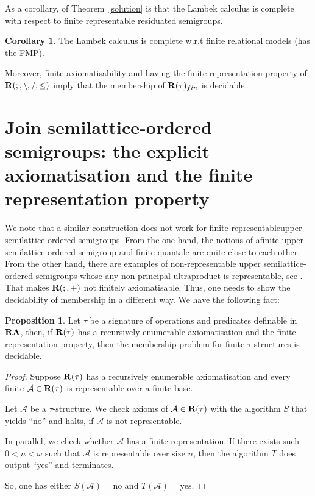 \documentclass[a4paper]{article}
\theoremstyle{definition}
\theoremstyle{theorem}
\theoremstyle{proposition}
\newtheorem{proposition}{Proposition}
\theoremstyle{lemma}
\theoremstyle{ex}
\theoremstyle{corollary}
\newtheorem{corollary}{Corollary}
\theoremstyle{claim}
\begin{document}
As a corollary, of Theorem~\ref{solution} is that the Lambek calculus is complete with respect to finite representable residuated semigroups.

\begin{corollary} \label{fmp}
  The Lambek calculus is complete w.r.t finite relational models (has the FMP).
\end{corollary}

Moreover, finite axiomatisability and having the finite representation property of ${\bf R}(;, \setminus, /, \leq)$ imply that the membership of ${\bf R}(\tau)_{fin}$ is decidable.

\section{Join semilattice-ordered semigroups: the explicit axiomatisation and the finite representation property}

We  note  that  a  similar  construction  does  not  work  for  finite  representableupper semilattice-ordered semigroups. From the one hand, the notions of afinite upper semilattice-ordered semigroup and finite quantale are quite close to each other. From the other hand, there are examples of non-representable upper semilattice-ordered semigroups whose any non-principal ultraproduct is representable, see \cite[Theorem 3.1]{andreka2011axiomatizability}. That makes ${\bf R}(;,+)$ not finitely axiomatisable. Thus, one needs to show the decidability of membership in a different way. We have the following fact:

\begin{proposition}\label{dec}
  Let $\tau$ be a signature of operations and predicates definable in ${\bf RA}$, then, if ${\bf R}(\tau)$ has a recursively enumerable axiomatisation and the finite representation property, then the membership problem for finite $\tau$-structures is decidable.
\end{proposition}

\begin{proof}
  Suppose ${\bf R}(\tau)$ has a recursively enumerable axiomatisation and every finite
  $\mathcal{A} \in {\bf R}(\tau)$ is representable over a finite base.

  Let $\mathcal{A}$ be a $\tau$-structure. We check axioms of $\mathcal{A} \in {\bf R}(\tau)$  with the algorithm $S$ that yields ``no'' and halts, if $\mathcal{A}$ is not representable.

  In parallel, we check whether $\mathcal{A}$ has a finite representation. If there exists such $0 < n < \omega$ such that $\mathcal{A}$ is representable over size $n$, then the algorithm $T$ does output ``yes'' and terminates.

  So, one has either $S(\mathcal{A}) = \text{no}$ and $T(\mathcal{A}) = \text{yes}$.
\end{proof}
\end{document}
